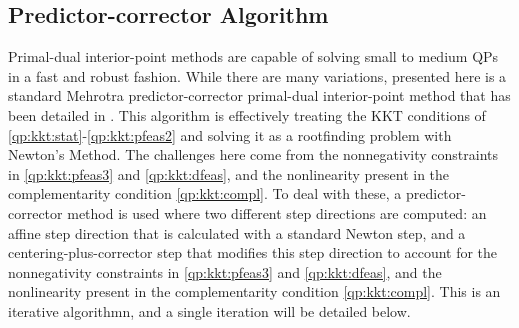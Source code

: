 \subsection{Predictor-corrector Algorithm}
Primal-dual interior-point methods are capable of solving small to medium QPs in a fast and robust fashion. While there are many variations, presented here is a standard Mehrotra predictor-corrector primal-dual interior-point method that has been detailed in \cite{mehrotra1992,vandenberghe,domahidi2013a,nesterov1997,andersen2003,nesterov1998,mattingley2012}. This algorithm is effectively treating the KKT conditions of \eqref{qp:kkt:stat}-\eqref{qp:kkt:pfeas2} and solving it as a rootfinding problem with Newton's Method. The challenges here come from the nonnegativity constraints in \eqref{qp:kkt:pfeas3} and \eqref{qp:kkt:dfeas}, and the nonlinearity present in the complementarity condition \eqref{qp:kkt:compl}. To deal with these, a predictor-corrector method is used where two different step directions are computed: an affine step direction that is calculated with a standard Newton step, and a centering-plus-corrector step that modifies this step direction to account for the nonnegativity constraints in \eqref{qp:kkt:pfeas3} and \eqref{qp:kkt:dfeas}, and the nonlinearity present in the complementarity condition \eqref{qp:kkt:compl}. This is an iterative algorithmn, and a single iteration will be detailed below.
%
